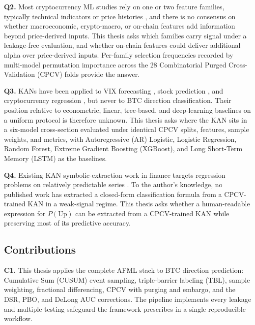 \documentclass[12pt,a4paper,oneside]{article}
\begin{document}
\textbf{Q2.} Most cryptocurrency ML studies rely on one or two feature families, typically technical indicators or price histories \citep{bourday_crypto_dl_2024}, and there is no consensus on whether macroeconomic, crypto-macro, or on-chain features add information beyond price-derived inputs. This thesis asks which families carry signal under a leakage-free evaluation, and whether on-chain features could deliver additional alpha over price-derived inputs. Per-family selection frequencies recorded by multi-model permutation importance across the 28 Combinatorial Purged Cross-Validation (CPCV) folds provide the answer.

\textbf{Q3.} KANs have been applied to VIX forecasting \citep{cho_lee_kim_2025}, stock prediction \citep{oad_kasper_2025}, and cryptocurrency regression \citep{gao_decokan_2025}, but never to BTC direction classification. Their position relative to econometric, linear, tree-based, and deep-learning baselines on a uniform protocol is therefore unknown. This thesis asks where the KAN sits in a six-model cross-section evaluated under identical CPCV splits, features, sample weights, and metrics, with Autoregressive (AR) Logistic, Logistic Regression, Random Forest, Extreme Gradient Boosting (XGBoost), and Long Short-Term Memory (LSTM) as the baselines.

\textbf{Q4.} Existing KAN symbolic-extraction work in finance targets regression problems on relatively predictable series \citep{cho_lee_kim_2025, oad_kasper_2025, gao_decokan_2025}. To the author's knowledge, no published work has extracted a closed-form classification formula from a CPCV-trained KAN in a weak-signal regime. This thesis asks whether a human-readable expression for $P(\text{Up})$ can be extracted from a CPCV-trained KAN while preserving most of its predictive accuracy.


\subsection{Contributions}\label{subsec:contributions}

\textbf{C1.} This thesis applies the complete AFML stack to BTC direction prediction: Cumulative Sum (CUSUM) event sampling, triple-barrier labeling (TBL), sample weighting, fractional differencing, CPCV with purging and embargo, and the DSR, PBO, and DeLong AUC corrections. The pipeline implements every leakage and multiple-testing safeguard the framework prescribes in a single reproducible workflow.
\end{document}
